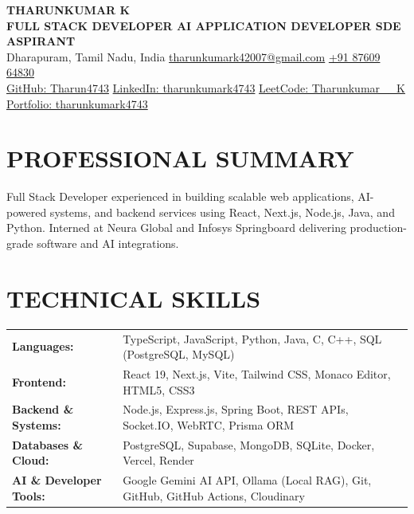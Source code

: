 \documentclass[a4paper,10pt]{article}
\begin{document}
\begin{center}
{\LARGE \textbf{THARUNKUMAR K}} \\[1.5pt]
{\small \textbf{FULL STACK DEVELOPER \textbar{} AI APPLICATION DEVELOPER \textbar{} SDE ASPIRANT}} \\[1.5pt]
Dharapuram, Tamil Nadu, India \textbar{} \href{mailto:tharunkumark42007@gmail.com}{tharunkumark42007@gmail.com} \textbar{} \href{tel:+918760964830}{+91 87609 64830} \\[1.5pt]
\href{https://github.com/Tharun4743}{GitHub: Tharun4743} \textbar{}
\href{https://linkedin.com/in/tharunkumark4743}{LinkedIn: tharunkumark4743} \textbar{}
\href{https://leetcode.com/u/Tharunkumar__K/}{LeetCode: Tharunkumar\_\_K} \textbar{}
\href{https://tharunkumark4743.netlify.app/}{Portfolio: tharunkumark4743}
\end{center}

\vspace{-4pt}

\section{PROFESSIONAL SUMMARY}
Full Stack Developer experienced in building scalable web applications, AI-powered systems, and backend services using React, Next.js, Node.js, Java, and Python. Interned at Neura Global and Infosys Springboard delivering production-grade software and AI integrations.

\section{TECHNICAL SKILLS}
\begin{tabular}{@{}p{1.30in}p{6.10in}@{}}
\textbf{Languages:} & TypeScript, JavaScript, Python, Java, C, C++, SQL (PostgreSQL, MySQL) \\
\textbf{Frontend:} & React 19, Next.js, Vite, Tailwind CSS, Monaco Editor, HTML5, CSS3 \\
\textbf{Backend \& Systems:} & Node.js, Express.js, Spring Boot, REST APIs, Socket.IO, WebRTC, Prisma ORM \\
\textbf{Databases \& Cloud:} & PostgreSQL, Supabase, MongoDB, SQLite, Docker, Vercel, Render \\
\textbf{AI \& Developer Tools:} & Google Gemini AI API, Ollama (Local RAG), Git, GitHub, GitHub Actions, Cloudinary \\
\end{tabular}
\end{document}
